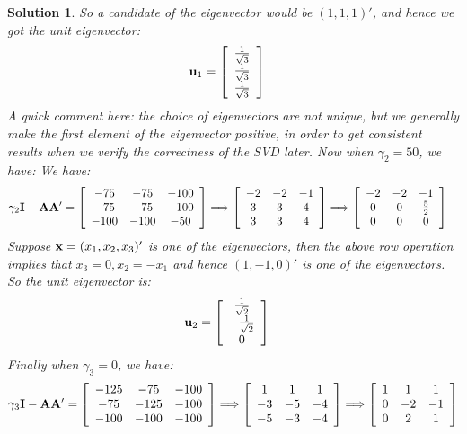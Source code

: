 \documentclass[11pt]{article}
\newtheorem{sol}{Solution}
\begin{document}
\begin{sol}
	 So a candidate of the eigenvector would be $(1, 1, 1)'$, and hence we got the unit eigenvector:
	 \begin{align*}
	 	{\bf u}_1 &= \left[\begin{array}{c}\frac{1}{\sqrt{3}}\\ \frac{1}{\sqrt{3}}\\ \frac{1}{\sqrt{3}}\end{array}\right]
	 \end{align*}
	 A quick comment here: the choice of eigenvectors are not unique, but we generally make the first element of the eigenvector positive, in order to get consistent results when we verify the correctness of the SVD later.\vskip 2mm
	 Now when $\gamma_2 = 50$, we have:\vskip 2mm
	 We have:
	 \begin{align*}
	 	\gamma_2{\bf I} - {\bf A}{\bf A}' &= \left[\begin{array}{ccc} -75&-75&-100\\ -75&-75&-100\\-100 &-100&-50\end{array}\right] \Longrightarrow\left[\begin{array}{ccc}-2&-2&-1\\ 3&3&4\\ 3&3&4\end{array}\right]\Longrightarrow \left[\begin{array}{ccc} -2& -2&-1\\ 0&0 &\frac{5}{2}\\ 0&0&0 \end{array}\right]
	 \end{align*}
	 Suppose ${\bf x} = (x_1, x_2, x_3)'$ is one of the eigenvectors, then the above row operation implies that $x_3 = 0, x_2 = -x_1$ and hence $(1, -1, 0)'$ is one of the eigenvectors. So the unit eigenvector is:
	 \begin{align*}
	 	{\bf u}_2 &= \left[\begin{array}{c}\frac{1}{\sqrt{2}}\\ -\frac{1}{\sqrt{2}}\\0 \end{array}\right]
	 \end{align*}
	 Finally when $\gamma_3 = 0$, we have:
	 \begin{align*}
	 	\gamma_3 {\bf I} - {\bf A}{\bf A}' &= \left[\begin{array}{ccc}-125&-75&-100 \\ -75&-125&-100 \\ -100&-100&-100 \end{array}\right]\Longrightarrow \left[\begin{array}{ccc} 1&1&1\\-3 &-5&-4\\ -5&-3&-4\end{array}\right]\Longrightarrow \left[\begin{array}{ccc} 1&1&1\\ 0&-2&-1 \\ 0&2&1 \end{array}\right]\\

\end{align*}
\end{sol}
\end{document}
